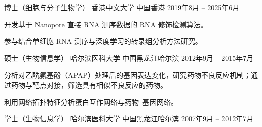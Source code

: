 
\begin{cventries}
  \cventry
    {博士（细胞与分子生物学）}
    {香港中文大学}
    {中国香港}
    {2019年8月 -- 2025年6月}
    {
      \begin{cvitems}
        \item {开发基于 Nanopore 直接 RNA 测序数据的 RNA 修饰检测算法。}
        \item {参与结合单细胞 RNA 测序与深度学习的转录组分析方法研究。}
      \end{cvitems}
    }

  \cventry
    {硕士（生物信息学）}
    {哈尔滨医科大学}
    {中国黑龙江哈尔滨}
    {2012年9月 -- 2015年7月}
    {
      \begin{cvitems}
        \item {分析对乙酰氨基酚（APAP）处理后的基因表达变化，研究药物不良反应机制；通过药物与靶点对接，筛选具有相似不良反应的药物。}
        \item {利用网络拓扑特征分析蛋白互作网络与药物--基因网络。}
      \end{cvitems}
    }

  \cventry
    {学士（生物信息学）}
    {哈尔滨医科大学}
    {中国黑龙江哈尔滨}
    {2007年9月 -- 2012年7月}
    {}
\end{cventries}
